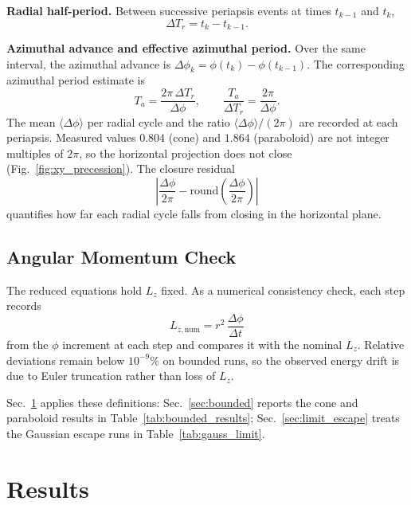 \documentclass[11pt,letterpaper]{article}
\newcommand{\parhead}[1]{\par\medskip\noindent\textbf{#1}\ignorespaces}
\begin{document}
\parhead{Radial half-period.}
Between successive periapsis events at times $t_{k-1}$ and $t_k$,
\begin{equation}\label{eq:Tr_num}
    \Delta T_r = t_k - t_{k-1}.
\end{equation}

\parhead{Azimuthal advance and effective azimuthal period.}
Over the same interval, the azimuthal advance is $\Delta\phi_k = \phi(t_k)-\phi(t_{k-1})$. The corresponding azimuthal period estimate is
\begin{equation}\label{eq:Ta_num}
    T_a = \frac{2\pi\,\Delta T_r}{\Delta\phi},
    \qquad
    \frac{T_a}{\Delta T_r} = \frac{2\pi}{\Delta\phi}.
\end{equation}
The mean $\langle\Delta\phi\rangle$ per radial cycle and the ratio $\langle\Delta\phi\rangle/(2\pi)$ are recorded at each periapsis. Measured values $0.804$ (cone) and $1.864$ (paraboloid) are not integer multiples of $2\pi$, so the horizontal projection does not close (Fig.~\ref{fig:xy_precession}). The closure residual
\begin{equation}\label{eq:closure_residual}
    \left|\frac{\Delta\phi}{2\pi} - \mathrm{round}\!\left(\frac{\Delta\phi}{2\pi}\right)\right|
\end{equation}
quantifies how far each radial cycle falls from closing in the horizontal plane.

\subsection{Angular Momentum Check}
\label{sec:analysis_Lzcheck}

The reduced equations hold $L_z$ fixed. As a numerical consistency check, each step records
\begin{equation}\label{eq:Lz_num}
    L_{z,\mathrm{num}} = r^2\,\frac{\Delta\phi}{\Delta t}
\end{equation}
from the $\phi$ increment at each step and compares it with the nominal $L_z$. Relative deviations remain below $10^{-9}\%$ on bounded runs, so the observed energy drift is due to Euler truncation rather than loss of $L_z$.

Sec.~\ref{sec:results} applies these definitions: Sec.~\ref{sec:bounded} reports the cone and paraboloid results in Table~\ref{tab:bounded_results}; Sec.~\ref{sec:limit_escape} treats the Gaussian escape runs in Table~\ref{tab:gauss_limit}.

\section{Results}
\label{sec:results}
\end{document}
